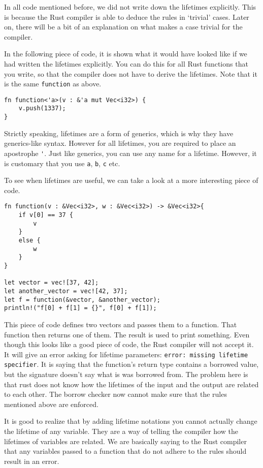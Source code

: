 In all code mentioned before, we did not write down the lifetimes explicitly. This is because the Rust compiler is able to deduce the rules in `trivial' cases. Later on, there will be a bit of an explanation on what makes a case trivial for the compiler.

In the following piece of code, it is shown what it would have looked like if we had written the lifetimes explicitly. You can do this for all Rust functions that you write, so that the compiler does not have to derive the lifetimes. Note that it is the same \verb|function| as above. 

\begin{verbatim}
fn function<'a>(v : &'a mut Vec<i32>) {
    v.push(1337);
}
\end{verbatim}

Strictly speaking, lifetimes are a form of generics, which is why they have generics-like syntax.  However for all lifetimes, you are required to place an apostrophe \verb|'|. Just like generics, you can use any name for a lifetime. However, it is customary that you use \verb|a|, \verb|b|, \verb|c| etc. 

To see when lifetimes are useful, we can take a look at a more interesting piece of code. 

\begin{verbatim}
fn function(v : &Vec<i32>, w : &Vec<i32>) -> &Vec<i32>{
    if v[0] == 37 {
        v
    }
    else {
        w
    }
}

let vector = vec![37, 42];
let another_vector = vec![42, 37];
let f = function(&vector, &another_vector);
println!("f[0] + f[1] = {}", f[0] + f[1]);
\end{verbatim}

This piece of code defines two vectors and passes them to a function. That function then returns one of them. The result is used to print something. Even though this looks like a good piece of code, the Rust compiler will not accept it. It will give an error asking for lifetime parameters: \texttt{error: missing lifetime specifier}. It is saying that the function's return type contains a borrowed value, but the signature doesn't say what is was borrowed from. The problem here is that rust does not know how the lifetimes of the input and the output are related to each other. The borrow checker now cannot make sure that the rules mentioned above are enforced. 

It is good to realize that by adding lifetime notations you cannot actually change the lifetime of any variable. They are a way of telling the compiler how the lifetimes of variables are related. We are basically saying to the Rust compiler that any variables passed to a function that do not adhere to the rules should result in an error. 

